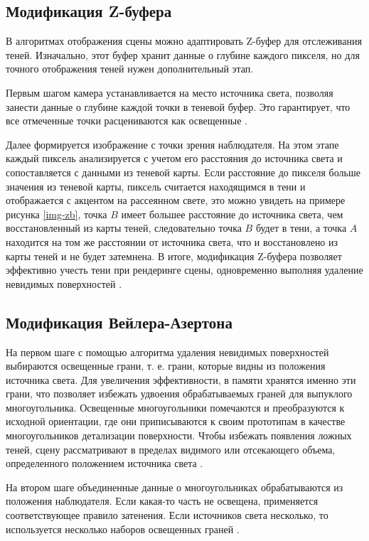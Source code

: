 \subsection{Модификация  Z-буфера}
В алгоритмах отображения сцены можно адаптировать Z-буфер для отслеживания теней. Изначально, этот буфер хранит данные о глубине каждого пикселя, но для точного отображения теней нужен дополнительный этап.

Первым шагом камера устанавливается на место источника света, позволяя занести данные о глубине каждой точки в теневой буфер. Это гарантирует, что все отмеченные точки расцениваются как освещенные \cite{letion}.

Далее формируется изображение с точки зрения наблюдателя. На этом этапе каждый пиксель анализируется с учетом его расстояния до источника света и сопоставляется с данными из теневой карты. Если расстояние до пикселя больше значения из теневой карты, пиксель считается находящимся в тени и отображается с акцентом на рассеянном свете, это можно увидеть на примере рисунка \ref{img-zb}, точка $ B $ имеет большее расстояние до источника света, чем восстановленный из карты теней, следовательно точка $ B $ будет в тени, а точка $ A $  находится на том же расстоянии от источника света, что и восстановлено из карты теней и не будет затемнена. В итоге, модификация Z-буфера позволяет эффективно учесть тени при рендеринге сцены, одновременно выполняя удаление невидимых поверхностей \cite{letion}.






\subsection{Модификация Вейлера-Азертона}

На первом шаге с помощью алгоритма удаления невидимых поверхностей выбираются освещенные грани, т. е. грани, которые видны из положения источника света. Для увеличения эффективности, в памяти хранятся именно эти грани, что позволяет избежать удвоения обрабатываемых граней для выпуклого многоугольника. Освещенные многоугольники помечаются и преобразуются к исходной ориентации, где они приписываются к своим прототипам в качестве многоугольников детализации поверхности. Чтобы избежать появления ложных теней, сцену рассматривают в пределах видимого или отсекающего объема, определенного положением источника света \cite{letion}.

На втором шаге объединенные данные о многоугольниках обрабатываются из положения наблюдателя. Если какая-то часть не освещена, применяется соответствующее правило затенения. Если источников света несколько, то используется несколько наборов освещенных граней \cite{letion}.


